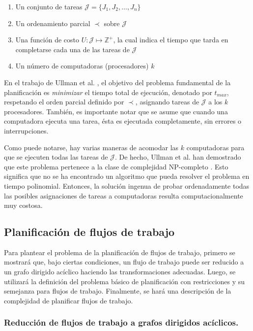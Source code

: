 \begin{enumerate}
\item Un conjunto de tareas $\mathcal{J} = \{ J_1, J_2, \dots, J_n \}$
\item Un ordenamiento parcial $\prec$ sobre $\mathcal{J}$
\item Una función de costo $U: \mathcal{J} \mapsto \mathbb{Z}^{+}$, la cual indica el tiempo que tarda en completarse cada una de las tareas de $\mathcal{J}$
\item Un número de computadoras (procesadores) $k$
\end{enumerate}

En el trabajo de Ullman et al. \cite{ullman1975np}, el objetivo del problema fundamental de la planificación es \emph{minimizar} el tiempo total de ejecución, denotado por $t_{max}$, respetando el orden parcial definido por $\prec$, asignando tareas de $\mathcal{J}$ a los $k$ procesadores. También, es importante notar que se asume que cuando una computadora ejecuta una tarea, ésta es ejecutada completamente, sin errores o interrupciones.

Como puede notarse, hay varias maneras de acomodar las $k$ computadoras para que se ejecuten todas las tareas de $\mathcal{J}$. De hecho, Ullman et al. han demostrado que este problema pertenece a la clase de complejidad NP-completo \cite{ullman1975np}. Esto significa que no se ha encontrado un algoritmo que pueda resolver el problema en tiempo polinomial. Entonces, la solución ingenua de probar ordenadamente todas las posibles asignaciones de tareas a computadoras resulta computacionalmente muy costosa.


\subsection{Planificación de flujos de trabajo}

Para plantear el problema de la planificación de flujos de trabajo, primero se mostrará que, bajo ciertas condiciones, un flujo de trabajo puede ser reducido a un grafo dirigido acíclico haciendo las transformaciones adecuadas. Luego, se utilizará la definición del problema básico de planificación con restricciones y su semejanza para flujos de trabajo. Finalmente, se hará una descripción de la complejidad de planificar flujos de trabajo.


\subsubsection{Reducción de flujos de trabajo a grafos dirigidos acíclicos.}

